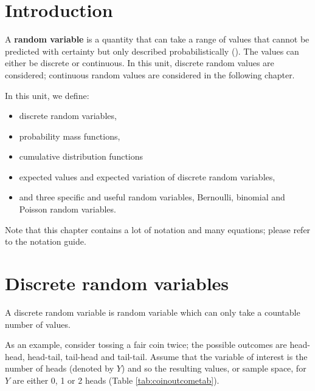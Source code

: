 \documentclass[
  oneside]{krantz}
\begin{document}
\hypertarget{INTdiscrv}{%
\section{Introduction}\label{INTdiscrv}}

A \textbf{random variable} is a quantity that can take a range of values that cannot be predicted with certainty but only described probabilistically (\citet{BorowskiBorwein}). The values can either be discrete or continuous. In this unit, discrete random values are considered; continuous random values are considered in the following chapter.

In this unit, we define:

\begin{itemize}
\item
  discrete random variables,
\item
  probability mass functions,
\item
  cumulative distribution functions
\item
  expected values and expected variation of discrete random variables,
\item
  and three specific and useful random variables, Bernoulli, binomial and Poisson random variables.
\end{itemize}

Note that this chapter contains a lot of notation and many equations; please refer to the notation guide.

\hypertarget{discrete-random-variables}{%
\section{Discrete random variables}\label{discrete-random-variables}}

A discrete random variable is random variable which can only take a countable number of values.

As an example, consider tossing a fair coin twice; the possible outcomes are head-head, head-tail, tail-head and tail-tail. Assume that the variable of interest is the number of heads (denoted by \(Y\)) and so the resulting values, or sample space, for \(Y\) are either 0, 1 or 2 heads (Table \ref{tab:coinoutcometab}).
\end{document}
